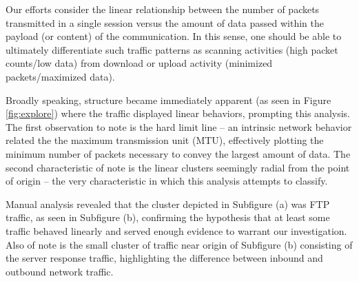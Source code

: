 Our efforts consider the linear relationship between the number of packets transmitted in a single session versus the amount of data passed within the payload (or content) of the communication. In this sense, one should be able to ultimately differentiate such traffic patterns as scanning activities (high packet counts/low data) from download or upload activity (minimized packets/maximized data).

Broadly speaking, structure became immediately apparent (as seen in Figure \ref{fig:explore}) where the traffic displayed linear behaviors, prompting this analysis. The first observation to note is the hard limit line -- an intrinsic network behavior related the the maximum transmission unit (MTU), effectively plotting the minimum number of packets necessary to convey the largest amount of data. The second characteristic of note is the linear clusters seemingly radial from the point of origin -- the very characteristic in which this analysis attempts to classify.

Manual analysis revealed that the cluster depicted in Subfigure (a) was FTP traffic, as seen in Subfigure (b), confirming the hypothesis that at least some traffic behaved linearly and served enough evidence to warrant our investigation. Also of note is the small cluster of traffic near origin of Subfigure (b) consisting of the server response traffic, highlighting the difference between inbound and outbound network traffic.